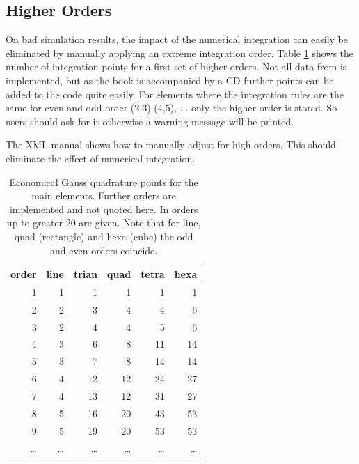 \subsection{Higher Orders}
On bad simulation results, the impact  of the numerical integration can easily
be  eliminated  by  manually  applying an  extreme  integration  order.  Table
\ref{tab:order_points} shows the number of  integration points for a first set
of higher orders. Not all data  from \cite{Solin04} is implemented, but as the
book is  accompanied by a  CD further  points can be  added to the  code quite
easily. For elements where the integration rules are the same for even and odd
order (2,3) (4,5),  ... only the higher  order is stored. So  users should ask
for it otherwise a warning message will be printed.

The  XML manual  shows how  to manually  adjust for  high orders.  This should
eliminate the effect of numerical integration.

\begin{table}
\begin{center}
\begin{tabular}{r|r|r|r|r|r}
order & line & trian & quad & tetra & hexa \\
\hline
1     & 1    & 1     & 1    & 1     & 1    \\ 
2     & 2    & 3     & 4    & 4     & 6    \\
3     & 2    & 4     & 4    & 5     & 6    \\
4     & 3    & 6     & 8    & 11    & 14   \\
5     & 3    & 7     & 8    & 14    & 14   \\
6     & 4    & 12    & 12   & 24    & 27   \\
7     & 4    & 13    & 12   & 31    & 27   \\
8     & 5    & 16    & 20   & 43    & 53   \\
9     & 5    & 19    & 20   & 53    & 53   \\
\ldots & \ldots & \ldots & \ldots & \ldots & \ldots \\
\end{tabular}
\caption{Economical  Gauss quadrature  points for  the main  elements. Further
  orders are implemented  and not quoted here. In \cite{Solin04}  orders up to
  greater 20 are  given. Note that for line, quad  (rectangle) and hexa (cube)
  the odd and even orders coincide.}
\label{tab:order_points}
\end{center}
\end{table}

